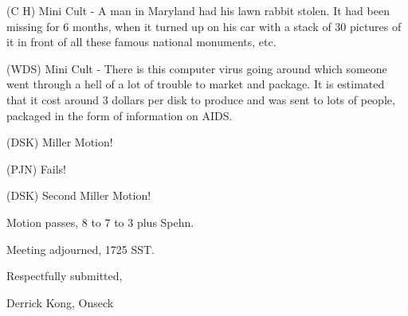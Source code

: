 (C H) Mini Cult - A man in Maryland had his lawn rabbit stolen.  It
had been missing for 6 months, when it turned up on his car with a
stack of 30 pictures of it in front of all these famous national
monuments, etc.

(WDS) Mini Cult - There is this computer virus going around which
someone went through a hell of a lot of trouble to market and package.
It is estimated that it cost around 3 dollars per disk to produce and was
sent to lots of people, packaged in the form of information on AIDS.

(DSK) Miller Motion!

(PJN) Fails!

(DSK) Second Miller Motion!

Motion passes, 8 to 7 to 3 plus Spehn.

Meeting adjourned, 1725 SST.

\vspace{0.15in}
\begin{center}
Respectfully submitted,

Derrick Kong, Onseck
\end{center}


